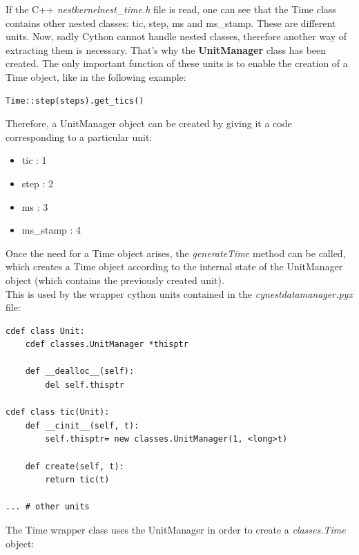 \documentclass{article}
\begin{document}
If the C++ \emph{nestkernel\/nest\_time.h} file is read, one can see that the Time class contains other nested classes: tic, step, ms and ms\_stamp. These are different units. Now, sadly Cython cannot handle nested classes, therefore another way of extracting them is necessary. That's why the \textbf{UnitManager} class has been created. The only important function of these units is to enable the creation of a Time object, like in the following example:
\begin{verbatim}
Time::step(steps).get_tics()
\end{verbatim}
Therefore, a UnitManager object can be created by giving it a code corresponding to a particular unit:
\begin{itemize}
\item tic       : 1
\item step      : 2
\item ms        : 3
\item ms\_stamp : 4
\end{itemize}
Once the need for a Time object arises, the \emph{generateTime} method can be called, which creates a Time object according to the internal state of the UnitManager object (which contains the previously created unit). \\
This is used by the wrapper cython units contained in the \emph{cynest\/datamanager.pyx} file:
\begin{verbatim}
cdef class Unit:
    cdef classes.UnitManager *thisptr

    def __dealloc__(self):
        del self.thisptr

cdef class tic(Unit):
    def __cinit__(self, t):
        self.thisptr= new classes.UnitManager(1, <long>t)

    def create(self, t):
        return tic(t)
        
... # other units
\end{verbatim}
The Time wrapper class uses the UnitManager in order to create a \emph{classes.Time} object:
\end{document}
